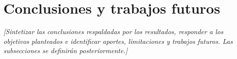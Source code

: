 
\chapter{Conclusiones y trabajos futuros}
\label{cap:conclusiones}

\textit{[Sintetizar las conclusiones respaldadas por los resultados, responder a
los objetivos planteados e identificar aportes, limitaciones y trabajos futuros.
Las subsecciones se definirán posteriormente.]}
